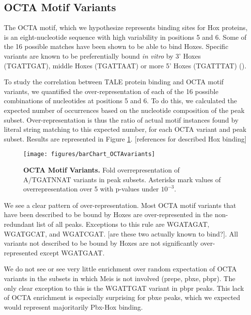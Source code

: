 \subsection{OCTA Motif Variants}

The \ac{OCTA} motif, which we hypothesize represents binding sites for Hox proteins, is an eight-nucleotide sequence with high variability in positions 5 and 6. Some of the 16 possible matches have been shown to be able to bind Hoxes. Specific variants are known to be preferentially bound \textit{in vitro} by 3' Hoxes (TGATTGAT), middle Hoxes (TGATTAAT) or more 5' Hoxes (TGATTTAT) (\cite{Shen1997a,Slattery2011}).

To study the correlation between \ac{TALE} protein binding and \ac{OCTA} motif variants, we quantified the over-representation of each of the 16 possible combinations of nucleotides at positions 5 and 6. To do this, we calculated the expected number of occurrences based on the nucleotide composition of the peak subset. Over-representation is thus the ratio of actual motif instances found by literal string matching to this expected number, for each \ac{OCTA} variant and peak subset. Results are represented in Figure \ref{fig:OCTAvariants}. [references for described Hox binding] 

\begin{figure}[]
  
  \centering
  \texttt{[image: figures/barChart\_OCTAvariants]}
  \caption[OCTA Motif Variants]{\textbf{OCTA Motif Variants.} Fold overrepresentation of A/TGATNNAT variants in peak subsets. Asterisks mark values of overrepresentation over 5 with p-values under $10^{-3}$.}
  \label{fig:OCTAvariants}
\end{figure}

We see a clear pattern of over-representation. Most \ac{OCTA} motif variants that have been described to be bound by Hoxes are over-represented in the non-redundant list of all peaks. Exceptions to this rule are WGATAGAT, WGATGCAT, and WGATCGAT. [are these two actually known to bind?]. All variants not described to be bound by Hoxes are not significantly over-represented except WGATGAAT.

We do not see or see very little enrichment over random expectation of \ac{OCTA} variants in the subsets in which Meis is not involved (\ac{prepe}, \ac{pbxe}, \ac{pbpr}). The only clear exception to this is the WGATTGAT variant in \ac{pbpr} peaks. This lack of \ac{OCTA} enrichment is especially surprising for \ac{pbxe} peaks, which we expected would represent majoritarily Pbx-Hox binding.

